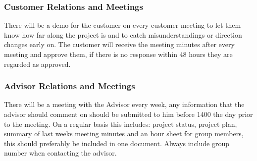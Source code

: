 \subsubsection{Customer Relations and Meetings}

There will be a demo for the customer on every customer meeting to let them
know how far along the project is and to catch misunderstandings or direction changes early on.
The customer will receive the meeting minutes after every meeting and approve them,
if there is no response within 48 hours they are regarded as approved.

\subsubsection{Advisor Relations and Meetings}

There will be a meeting with the Advisor every week, any information that the advisor
should comment on should be submitted to him before 1400 the day prior to the meeting.
On a regular basis this includes: project status, project plan, summary of last weeks
meeting minutes and an hour sheet for group members, this should preferably be included in one document.
Always include group number when contacting the advisor.
